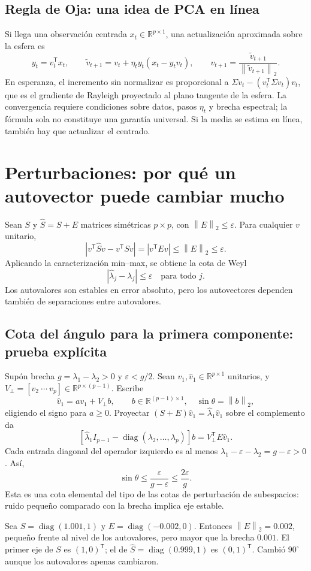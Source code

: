 \documentclass[11pt,a4paper]{article}
\newcommand{\R}{\mathbb R}
\newcommand{\T}{^{\mathsf T}}
\newcommand{\norm}[1]{\left\lVert #1\right\rVert}
\DeclareMathOperator{\diag}{diag}
\theoremstyle{definition}
\begin{document}
\subsection{Regla de Oja: una idea de PCA en línea}
Si llega una observación centrada $x_t\in\R^{p\times1}$, una actualización aproximada sobre la esfera es
\[
y_t=v_t\T x_t,\qquad
\widetilde v_{t+1}=v_t+\eta_t y_t(x_t-y_tv_t),\qquad
v_{t+1}=\frac{\widetilde v_{t+1}}{\norm{\widetilde v_{t+1}}_2}.
\]
En esperanza, el incremento sin normalizar es proporcional a $\Sigma v_t-(v_t\T\Sigma v_t)v_t$, que es el gradiente de Rayleigh proyectado al plano tangente de la esfera. La convergencia requiere condiciones sobre datos, pasos $\eta_t$ y brecha espectral; la fórmula sola no constituye una garantía universal. Si la media se estima en línea, también hay que actualizar el centrado.

\section{Perturbaciones: por qué un autovector puede cambiar mucho}
Sean $S$ y $\widehat S=S+E$ matrices simétricas $p\times p$, con $\norm E_2\le\varepsilon$. Para cualquier $v$ unitario,
\[
|v\T\widehat Sv-v\T Sv|=|v\T Ev|\le\norm E_2\le\varepsilon.
\]
Aplicando la caracterización min--max, se obtiene la cota de Weyl
\[
\boxed{|\widehat\lambda_j-\lambda_j|\le\varepsilon\quad\text{para todo }j.}
\]
Los autovalores son estables en error absoluto, pero los autovectores dependen también de separaciones entre autovalores.
\subsection{Cota del ángulo para la primera componente: prueba explícita}
Supón brecha $g=\lambda_1-\lambda_2>0$ y $\varepsilon<g/2$. Sean $v_1,\widehat v_1\in\R^{p\times1}$ unitarios, y $V_\perp=[v_2\ \cdots\ v_p]\in\R^{p\times(p-1)}$. Escribe
\[
\widehat v_1=a v_1+V_\perp b,\qquad b\in\R^{(p-1)\times1},\quad
\sin\theta=\norm b_2,
\]
eligiendo el signo para $a\ge0$. Proyectar $(S+E)\widehat v_1=\widehat\lambda_1\widehat v_1$ sobre el complemento da
\[
[\widehat\lambda_1 I_{p-1}-\diag(\lambda_2,\ldots,\lambda_p)]b
=V_\perp\T E\widehat v_1.
\]
Cada entrada diagonal del operador izquierdo es al menos $\lambda_1-\varepsilon-\lambda_2=g-\varepsilon>0$. Así,
\[
\boxed{\sin\theta\le\frac{\varepsilon}{g-\varepsilon}\le\frac{2\varepsilon}{g}}.
\]
Esta es una cota elemental del tipo de las cotas de perturbación de subespacios: ruido pequeño comparado con la brecha implica eje estable.
\begin{ejemplo}
Sea $S=\diag(1.001,1)$ y $E=\diag(-0.002,0)$. Entonces $\norm E_2=0.002$, pequeño frente al nivel de los autovalores, pero mayor que la brecha $0.001$. El primer eje de $S$ es $(1,0)\T$; el de $\widehat S=\diag(0.999,1)$ es $(0,1)\T$. Cambió $90^\circ$ aunque los autovalores apenas cambiaron.
\end{ejemplo}
\end{document}
